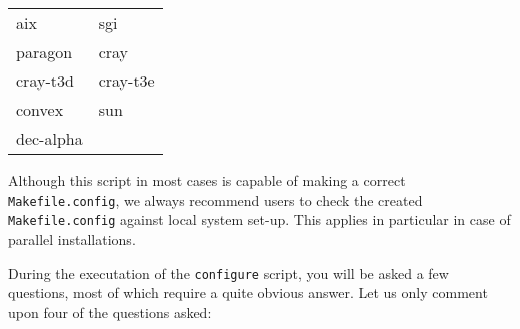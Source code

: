 \bigskip

\begin{tabular}{ll}
aix\hspace{6cm} &  sgi\\
paragon &  cray\\
cray-t3d &  cray-t3e\\
 convex &  sun\\
 dec-alpha\\
\end{tabular}

\bigskip

Although this script in most cases is capable of making a correct
\verb|Makefile.config|, we always recommend users to check the created
\verb|Makefile.config| against local system set-up. This applies in
particular in case of parallel installations.

During the executation of the \verb|configure| script, you will be
asked a few questions, most of which require a quite obvious
answer. Let us only comment upon four of the questions asked:

